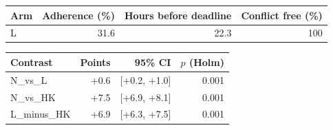 \begin{tabular}{lrrr}
\hline
Arm & Adherence (\%) & Hours before deadline & Conflict free (\%) \\
\hline
L & 31.6 & 22.3 & 100 \\
\hline
\end{tabular}

\begin{tabular}{lrrr}
\hline
Contrast & Points & 95\% CI & $p$ (Holm) \\
\hline
N_vs_L & +0.6 & [+0.2, +1.0] & 0.001 \\
N_vs_HK & +7.5 & [+6.9, +8.1] & 0.001 \\
L_minus_HK & +6.9 & [+6.3, +7.5] & 0.001 \\
\hline
\end{tabular}
